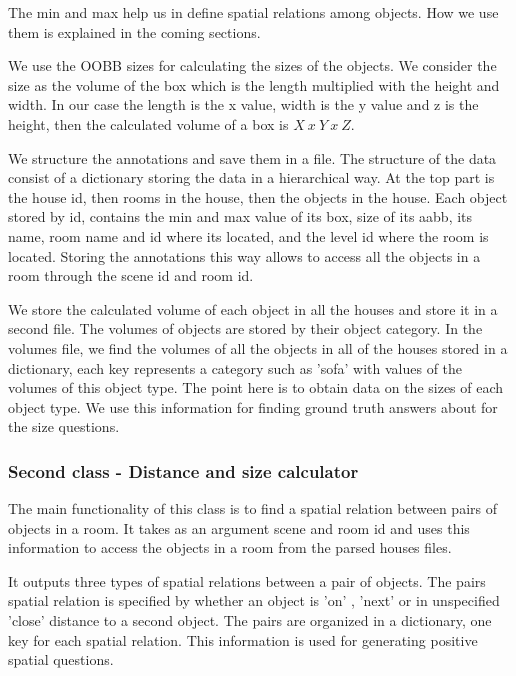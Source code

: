 The min and max help us in define spatial relations among objects. How we use them is explained in the coming sections.

We use the OOBB sizes for calculating the sizes of the objects. We consider the size as the volume of the box which is the length multiplied with the height and width. In our case the length is the x value, width is the y value and z is the height, then  the calculated volume of a box is \begin{math} X\ x\ Y\ x\ Z \end{math}. 


We structure the annotations and save them in a file. The structure of the data consist of a dictionary storing the data in a hierarchical way. At the top part is the house id, then rooms in the house, then the objects in the house. Each object stored by id, contains the min and max value of its box, size of its aabb, its name, room name and id where its located, and the level id where the room is located. Storing the annotations this way allows to access all the objects in a room through the scene id and room id. 

 We store the calculated volume of each object in all the houses and store it in a second file. The volumes of objects are stored by their object category. In the volumes file, we find the volumes of all the objects in all of the houses stored in a dictionary, each key represents a category such as 'sofa' with values of the volumes of this object type. The point here is to obtain data on the sizes of each object type. We use this information for finding ground truth answers about for the size questions.  
 

\subsubsection{Second class - Distance and size calculator}

The main functionality of this class is to find a spatial relation between pairs of objects in a room. It takes as an argument scene and room id and uses this information to access the objects in a room from the parsed houses files. 

It outputs three types of spatial relations between a pair of objects. The pairs spatial relation is specified by whether an object is 'on' , 'next' or in unspecified 'close' distance to a second object. The pairs are organized in a dictionary, one key for each spatial relation. This information is used for generating positive spatial questions. 

